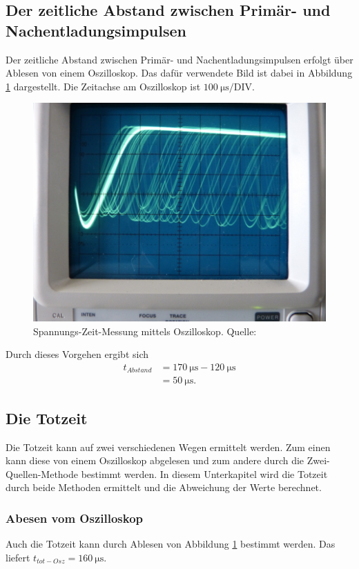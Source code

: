 \subsection{Der zeitliche Abstand zwischen Primär- und Nachentladungsimpulsen}
\label{subsec:abstand}
Der zeitliche Abstand zwischen Primär- und Nachentladungsimpulsen erfolgt über Ablesen von einem
Oszilloskop. Das dafür verwendete Bild ist dabei in Abbildung \ref{fig:Osz} dargestellt. Die Zeitachse
am Oszilloskop ist $\SI{100}{\micro\second}/\text{DIV}$.
\begin{figure}[H]
    \centering
    \includegraphics[scale=0.5]{content/Osz.png}
    \caption{Spannungs-Zeit-Messung mittels Oszilloskop. Quelle:\cite{AP02}}
    \label{fig:Osz}
  \end{figure}
Durch dieses Vorgehen ergibt sich
\begin{align*}
    t_{Abstand}&=\SI{170}{\micro\second}-\SI{120}{\micro\second}\\
               &=\SI{50}{\micro\second}.
\end{align*}

\subsection{Die Totzeit}
\label{subsec:totzeit}
Die Totzeit kann auf zwei verschiedenen Wegen ermittelt werden. Zum einen kann diese von einem Oszilloskop
abgelesen und zum andere durch die Zwei-Quellen-Methode bestimmt werden. 
In diesem Unterkapitel wird die Totzeit durch beide Methoden ermittelt und die Abweichung der Werte 
berechnet. 
\subsubsection*{Abesen vom Oszilloskop}
        Auch die Totzeit kann durch Ablesen von Abbildung \ref{fig:Osz} bestimmt werden. Das liefert
        $t_{tot-Osz}=\SI{160}{\micro\second}$.
